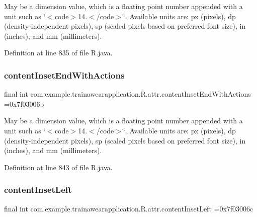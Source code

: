 May be a dimension value, which is a floating point number appended with a unit such as \char`\"{}$<$code$>$14.\+5sp$<$/code$>$\char`\"{}. Available units are\+: px (pixels), dp (density-\/independent pixels), sp (scaled pixels based on preferred font size), in (inches), and mm (millimeters). 

Definition at line 835 of file R.\+java.

\mbox{\label{classcom_1_1example_1_1trainawearapplication_1_1_r_1_1attr_a501e43a23a32d08c31a83d94271eeaf7}} 
\subsubsection{\texorpdfstring{contentInsetEndWithActions}{contentInsetEndWithActions}}
{\footnotesize\ttfamily final int com.\+example.\+trainawearapplication.\+R.\+attr.\+content\+Inset\+End\+With\+Actions =0x7f03006b\hspace{0.3cm}{\ttfamily [static]}}

May be a dimension value, which is a floating point number appended with a unit such as \char`\"{}$<$code$>$14.\+5sp$<$/code$>$\char`\"{}. Available units are\+: px (pixels), dp (density-\/independent pixels), sp (scaled pixels based on preferred font size), in (inches), and mm (millimeters). 

Definition at line 843 of file R.\+java.

\mbox{\label{classcom_1_1example_1_1trainawearapplication_1_1_r_1_1attr_a61ecc5033e7caec3323cad185e4f29b5}} 
\subsubsection{\texorpdfstring{contentInsetLeft}{contentInsetLeft}}
{\footnotesize\ttfamily final int com.\+example.\+trainawearapplication.\+R.\+attr.\+content\+Inset\+Left =0x7f03006c\hspace{0.3cm}{\ttfamily [static]}}

